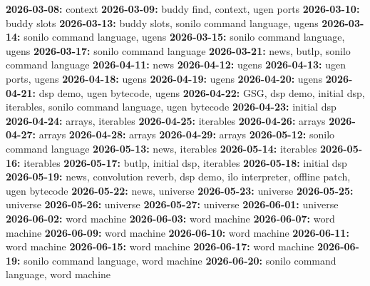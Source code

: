 {\noindent \bf 2026-03-08:} context\smallskip
{\noindent \bf 2026-03-09:} buddy find, context, ugen ports\smallskip
{\noindent \bf 2026-03-10:} buddy slots\smallskip
{\noindent \bf 2026-03-13:} buddy slots, sonilo command language, ugens\smallskip
{\noindent \bf 2026-03-14:} sonilo command language, ugens\smallskip
{\noindent \bf 2026-03-15:} sonilo command language, ugens\smallskip
{\noindent \bf 2026-03-17:} sonilo command language\smallskip
{\noindent \bf 2026-03-21:} news, butlp, sonilo command language\smallskip
{\noindent \bf 2026-04-11:} news\smallskip
{\noindent \bf 2026-04-12:} ugens\smallskip
{\noindent \bf 2026-04-13:} ugen ports, ugens\smallskip
{\noindent \bf 2026-04-18:} ugens\smallskip
{\noindent \bf 2026-04-19:} ugens\smallskip
{\noindent \bf 2026-04-20:} ugens\smallskip
{\noindent \bf 2026-04-21:} dsp demo, ugen bytecode, ugens\smallskip
{\noindent \bf 2026-04-22:} GSG, dsp demo, initial dsp, iterables, sonilo command language, ugen bytecode\smallskip
{\noindent \bf 2026-04-23:} initial dsp\smallskip
{\noindent \bf 2026-04-24:} arrays, iterables\smallskip
{\noindent \bf 2026-04-25:} iterables\smallskip
{\noindent \bf 2026-04-26:} arrays\smallskip
{\noindent \bf 2026-04-27:} arrays\smallskip
{\noindent \bf 2026-04-28:} arrays\smallskip
{\noindent \bf 2026-04-29:} arrays\smallskip
{\noindent \bf 2026-05-12:} sonilo command language\smallskip
{\noindent \bf 2026-05-13:} news, iterables\smallskip
{\noindent \bf 2026-05-14:} iterables\smallskip
{\noindent \bf 2026-05-16:} iterables\smallskip
{\noindent \bf 2026-05-17:} butlp, initial dsp, iterables\smallskip
{\noindent \bf 2026-05-18:} initial dsp\smallskip
{\noindent \bf 2026-05-19:} news, convolution reverb, dsp demo, ilo interpreter, offline patch, ugen bytecode\smallskip
{\noindent \bf 2026-05-22:} news, universe\smallskip
{\noindent \bf 2026-05-23:} universe\smallskip
{\noindent \bf 2026-05-25:} universe\smallskip
{\noindent \bf 2026-05-26:} universe\smallskip
{\noindent \bf 2026-05-27:} universe\smallskip
{\noindent \bf 2026-06-01:} universe\smallskip
{\noindent \bf 2026-06-02:} word machine\smallskip
{\noindent \bf 2026-06-03:} word machine\smallskip
{\noindent \bf 2026-06-07:} word machine\smallskip
{\noindent \bf 2026-06-09:} word machine\smallskip
{\noindent \bf 2026-06-10:} word machine\smallskip
{\noindent \bf 2026-06-11:} word machine\smallskip
{\noindent \bf 2026-06-15:} word machine\smallskip
{\noindent \bf 2026-06-17:} word machine\smallskip
{\noindent \bf 2026-06-19:} sonilo command language, word machine\smallskip
{\noindent \bf 2026-06-20:} sonilo command language, word machine\smallskip
